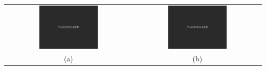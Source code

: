 \lipsum[2][1-2]

\begin{center}
	\setlength{\tabcolsep}{2pt}
	\begin{tabular}{cc}
		\includegraphics[height=0.36\textwidth, width=0.48\textwidth]{fig/placeholder.pdf}  &
		\includegraphics[height=0.36\textwidth, width=0.48\textwidth]{fig/placeholder.pdf} \\ [-1ex]
		\scriptsize{(a)} & \scriptsize{(b)}
	\end{tabular}
	\vspace{-5pt}
	\label{fig:figlabel}
\end{center}

\lipsum[2]
